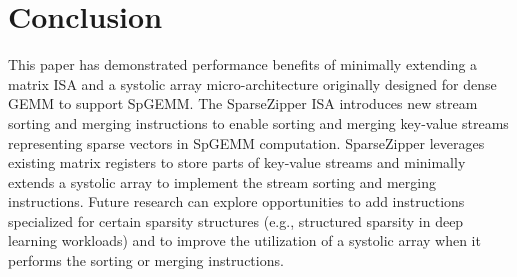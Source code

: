 
\section{Conclusion}
\label{sec-spz-conclusion}

This paper has demonstrated performance benefits of minimally extending a
matrix ISA and a systolic array micro-architecture originally designed for
dense GEMM to support SpGEMM.
The SparseZipper ISA introduces new stream sorting and merging instructions to
enable sorting and merging key-value streams representing sparse vectors in
SpGEMM computation.
SparseZipper leverages existing matrix registers to store parts of key-value
streams and minimally extends a systolic array to implement the stream sorting
and merging instructions.
Future research can explore opportunities to add instructions specialized for
certain sparsity structures (e.g., structured sparsity in deep learning
workloads) and to improve the utilization of a systolic array when it performs
the sorting or merging instructions.
